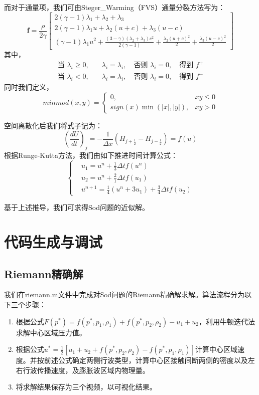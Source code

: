 \documentclass[12pt,a4paper]{article}%
\begin{document}
		而对于通量项，我们可由Steger\_Warming（FVS）通量分裂方法写为：
		\[
		\mathbf{f} = \frac{\rho}{2\gamma}
		\begin{bmatrix}
			2(\gamma - 1)\lambda_1 + \lambda_2 + \lambda_3 \\
			2(\gamma - 1)\lambda_1 u + \lambda_2 (u + c) + \lambda_3 (u - c) \\
			(\gamma - 1)\lambda_1 u^2 + \frac{(3 - \gamma)(\lambda_2 + \lambda_3)c^2}{2(\gamma - 1)} + \frac{\lambda_2 (u + c)^2}{2} + \frac{\lambda_3 (u - c)^2}{2}
		\end{bmatrix}
		\]
		其中，
		\[
		\begin{aligned}
			\text{当 } \lambda_i \geq 0,\quad & \lambda_i = \lambda_i,\quad \text{否则 } \lambda_i = 0,\quad \text{得到 } f^+ \\
			\text{当 } \lambda_i < 0,\quad & \lambda_i = \lambda_i,\quad \text{否则 } \lambda_i = 0,\quad \text{得到 } f^-
		\end{aligned}
		\]
		同时我们定义，
		\[
			minmod(x,y) = 
			\begin{cases}
				0, & xy \leq 0 \\
				sign(x)\min(|x|,|y|), & xy>0
			\end{cases}
		\]
		
		空间离散化后我们将式子记为：
		\[
			(\frac{dU}{dt})_j = -\frac{1}{\Delta x}(H_{j+\frac12} - H_{j-\frac12}) = f(u)
		\]
		根据Runge-Kutta方法，我们由如下推进时间计算公式：
		\[
		\left\{
			\begin{aligned}
				& u_1 = u^n + \frac13 \Delta t f(u^n) \\
				& u_2 = u^n + \frac21 \Delta t f(u_1) \\
				& u^{n+1} = \frac14 (u^n+3u_1) + \frac34 \Delta t f(u_2)
			\end{aligned}
		\right.
		\]
		
		基于上述推导，我们可求得Sod问题的近似解。
		
	\section{代码生成与调试}
		\subsection{Riemann精确解}
		我们在riemann.m文件中完成对Sod问题的Riemann精确解求解。算法流程分为以下三个步骤：
		\begin{enumerate}
			\item 根据公式$F(p^*) = f(p^*,p_1,\rho_1) + f(p^*,p_2,\rho_2) - u_1 + u_2$，利用牛顿迭代法求解中心区域压力值。
			\item 根据公式$u^* = \frac{1}{2}[u_1 + u_2 + f(p^*,p_2,\rho_2) - f(p^*,p_1,\rho_1)]$计算中心区域速度。并按前述公式确定两侧行波类型，计算中心区接触间断两侧的密度以及左右行波传播速度，及膨胀波区域内物理量。
			\item 将求解结果保存为三个视频，以可视化结果。
		\end{enumerate}
		
\end{document}
